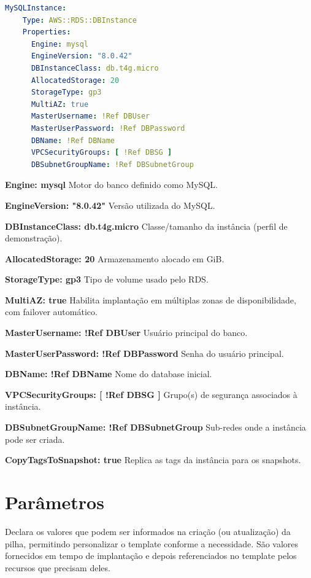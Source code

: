 \begin{lstlisting}[language=YAML]
MySQLInstance:
    Type: AWS::RDS::DBInstance
    Properties:
      Engine: mysql
      EngineVersion: "8.0.42"
      DBInstanceClass: db.t4g.micro
      AllocatedStorage: 20
      StorageType: gp3
      MultiAZ: true
      MasterUsername: !Ref DBUser
      MasterUserPassword: !Ref DBPassword
      DBName: !Ref DBName
      VPCSecurityGroups: [ !Ref DBSG ]
      DBSubnetGroupName: !Ref DBSubnetGroup
\end{lstlisting}

\textbf{Engine: mysql} Motor do banco definido como MySQL.

\textbf{EngineVersion: "8.0.42"} Versão utilizada do MySQL.

\textbf{DBInstanceClass: db.t4g.micro} Classe/tamanho da instância (perfil de demonstração).

\textbf{AllocatedStorage: 20} Armazenamento alocado em GiB.

\textbf{StorageType: gp3} Tipo de volume usado pelo RDS.

\textbf{MultiAZ: true} Habilita implantação em múltiplas zonas de disponibilidade, com failover automático.

\textbf{MasterUsername: !Ref DBUser} Usuário principal do banco.

\textbf{MasterUserPassword: !Ref DBPassword} Senha do usuário principal.

\textbf{DBName: !Ref DBName} Nome do database inicial.

\textbf{VPCSecurityGroups: [ !Ref DBSG ]} Grupo(s) de segurança associados à instância.

\textbf{DBSubnetGroupName: !Ref DBSubnetGroup} Sub-redes onde a instância pode ser criada.

\textbf{CopyTagsToSnapshot: true} Replica as tags da instância para os snapshots.


\section{Parâmetros}
Declara os valores que podem ser informados na criação (ou atualização) da pilha, permitindo personalizar o template conforme a necessidade. São valores fornecidos em tempo de implantação e depois referenciados no template pelos recursos que precisam deles.
 
